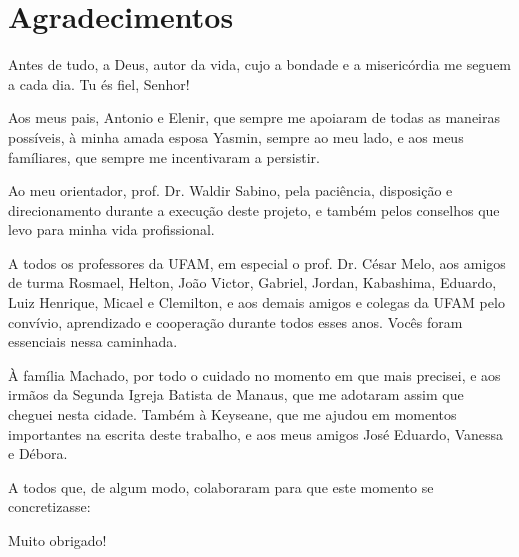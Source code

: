 \chapter*{Agradecimentos}
\thispagestyle{empty}


Antes de tudo, a Deus, autor da vida, cujo a bondade e a misericórdia me seguem a cada dia. Tu és fiel, Senhor!
	

Aos meus pais, Antonio e Elenir, que sempre me apoiaram de todas as maneiras possíveis, à minha amada esposa Yasmin, sempre ao meu lado, e aos meus famíliares, que sempre me incentivaram a persistir.
	

Ao meu orientador, prof. Dr. Waldir Sabino, pela paciência, disposição e direcionamento durante a execução deste projeto, e também pelos conselhos que levo para minha vida profissional.
	

A todos os professores da UFAM, em especial o prof. Dr. César Melo, aos amigos de turma Rosmael, Helton, João Victor, Gabriel, Jordan, Kabashima, Eduardo, Luiz Henrique, Micael e Clemilton, e aos demais amigos e colegas da UFAM pelo convívio, aprendizado e cooperação durante todos esses anos. Vocês foram essenciais nessa caminhada.
	

À família Machado, por todo o cuidado no momento em que mais precisei, e aos irmãos da Segunda Igreja Batista de Manaus, que me adotaram assim que cheguei nesta cidade. Também à Keyseane, que me ajudou em momentos importantes na escrita deste trabalho, e aos meus amigos José Eduardo, Vanessa e Débora.

	
A todos que, de algum modo, colaboraram para que este momento se concretizasse:

\begin{flushright}
	Muito obrigado!
\end{flushright}